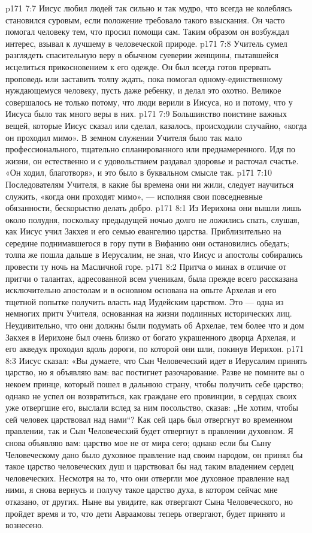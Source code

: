 \vs p171 7:7 Иисус любил людей так сильно и так мудро, что всегда не колеблясь становился суровым, если положение требовало такого взыскания. Он часто помогал человеку тем, что просил помощи сам. Таким образом он возбуждал интерес, взывал к лучшему в человеческой природе.
\vs p171 7:8 Учитель сумел разглядеть спасительную веру в обычном суеверии женщины, пытавшейся исцелиться прикосновением к его одежде. Он был всегда готов прервать проповедь или заставить толпу ждать, пока помогал одному\hyp{}единственному нуждающемуся человеку, пусть даже ребенку, и делал это охотно. Великое совершалось не только потому, что люди верили в Иисуса, но и потому, что у Иисуса было так много веры в них.
\vs p171 7:9 Большинство поистине важных вещей, которые Иисус сказал или сделал, казалось, происходили случайно, «когда он проходил мимо». В земном служении Учителя было так мало профессионального, тщательно спланированного или преднамеренного. Идя по жизни, он естественно и с удовольствием раздавал здоровье и расточал счастье. «Он ходил, благотворя», и это было в буквальном смысле так.
\vs p171 7:10 Последователям Учителя, в какие бы времена они ни жили, следует научиться служить, «когда они проходят мимо», --- исполняя свои повседневные обязанности, бескорыстно делать добро.
\vs p171 8:1 Из Иерихона они вышли лишь около полудня, поскольку предыдущей ночью долго не ложились спать, слушая, как Иисус учил Закхея и его семью евангелию царства. Приблизительно на середине поднимавшегося в гору пути в Вифанию они остановились обедать; толпа же пошла дальше в Иерусалим, не зная, что Иисус и апостолы собирались провести ту ночь на Масличной горе.
\vs p171 8:2 Притча о минах в отличие от притчи о талантах, адресованной всем ученикам, была прежде всего рассказана исключительно апостолам и в основном основана на опыте Архелая и его тщетной попытке получить власть над Иудейским царством. Это --- одна из немногих притч Учителя, основанная на жизни подлинных исторических лиц. Неудивительно, что они должны были подумать об Архелае, тем более что и дом Закхея в Иерихоне был очень близко от богато украшенного дворца Архелая, и его акведук проходил вдоль дороги, по которой они шли, покинув Иерихон.
\vs p171 8:3 \pc Иисус сказал: «Вы думаете, что Сын Человеческий идет в Иерусалим принять царство, но я объявляю вам: вас постигнет разочарование. Разве не помните вы о некоем принце, который пошел в дальнюю страну, чтобы получить себе царство; однако не успел он возвратиться, как граждане его провинции, в сердцах своих уже отвергшие его, выслали вслед за ним посольство, сказав: „Не хотим, чтобы сей человек царствовал над нами“? Как сей царь был отвергнут во временном правлении, так и Сын Человеческий будет отвергнут в правлении духовном. Я снова объявляю вам: царство мое не от мира сего; однако если бы Сыну Человеческому дано было духовное правление над своим народом, он принял бы такое царство человеческих душ и царствовал бы над таким владением сердец человеческих. Несмотря на то, что они отвергли мое духовное правление над ними, я снова вернусь и получу такое царство духа, в котором сейчас мне отказано, от других. Ныне вы увидите, как отвергают Сына Человеческого, но пройдет время и то, что дети Авраамовы теперь отвергают, будет принято и вознесено.

